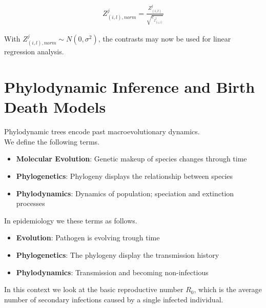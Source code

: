 \documentclass{article}
\begin{document}
\begin{multicols*}{3}
\begin{align*}
    Z^j_{(i,l), norm} = \frac{Z^j_{(i,l)}}{\sqrt{c_{z^j_{(i,l)}}}}
\end{align*}

With $Z^j_{(i,l), norm} \sim N(0, \sigma ^2)$, the contrasts may now be used for linear regression analysis. 

\section{Phylodynamic Inference and Birth Death Models}

Phylodynamic trees encode past macroevolutionary dynamics. \\%
We define the following terms.
\begin{itemize}
    \item \textbf{Molecular Evolution}: Genetic makeup of species changes through time 
    \item \textbf{Phylogenetics}: Phylogeny displays the relationship between species
    \item \textbf{Phylodynamics}: Dynamics of population; speciation and extinction processes 
\end{itemize}

In epidemiology we these terms as follows. 

\begin{itemize}
    \item \textbf{Evolution}: Pathogen is evolving trough time
    \item \textbf{Phylogenetics}: The phylogeny display the transmission history
    \item \textbf{Phylodynamics}: Transmission and becoming non-infectious
\end{itemize}

In this context we look at the basic reproductive number $R_0$, which is the average number of secondary infections caused by a single infected individual.\\


\end{multicols*}
\end{document}
